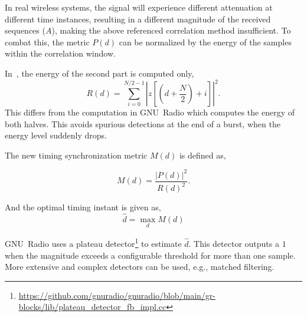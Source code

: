 In real wireless systems, the signal will experience different attenuation at different time instances, resulting in a different magnitude of the received sequences ($A$), making the above referenced correlation method insufficient. To combat this, the metric $P(d)$ can be normalized by the energy of the samples within the correlation window.

In~\cite{650240}, the energy of the second part is computed only,
\begin{equation*} 
                R(d) = \sum_{i=0}^{N/2-1} \left|z\left[\left(d+\frac{N}{2}\right)+ i\right]\right|^2.
\end{equation*}
This differs from the computation in GNU~Radio which computes the energy of both halves. This avoids spurious detections at the end of a burst, when the energy level suddenly drops.

The new timing synchronization metric $M(d)$ is defined as,

\begin{equation}\label{eqOFDMmd} 
        M(d) = \frac{|P(d)|^2}{R(d)^2}.
\end{equation}

And the optimal timing instant is given as,
\begin{equation}\label{eqOFDMoptimalTiming} 
        \hat d = \max _{d} M(d) 
\end{equation}

GNU~Radio uses a plateau detector\footnote{\url{https://github.com/gnuradio/gnuradio/blob/main/gr-blocks/lib/plateau_detector_fb_impl.cc}} to estimate $\hat d$. This detector outputs a $1$ when the magnitude exceeds a configurable threshold for more than one sample. More extensive and complex detectors can be used, e.g., matched filtering.




